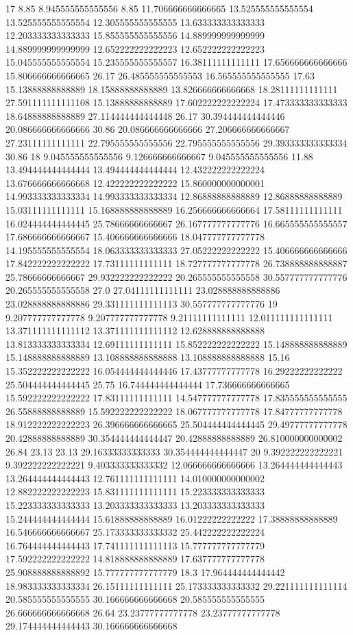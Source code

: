 17 8.85 8.945555555555556 8.85 11.706666666666665 13.525555555555554 13.525555555555554 12.305555555555555 13.633333333333333 12.203333333333333 15.855555555555556 14.889999999999999 14.889999999999999 12.652222222222223 12.652222222222223 15.045555555555554 15.235555555555557 16.38111111111111 17.656666666666666 15.806666666666665 26.17 26.485555555555553 16.565555555555555 17.63 15.13888888888889 18.15888888888889 13.826666666666668 18.28111111111111 27.591111111111108 15.13888888888889 17.602222222222224 17.473333333333333 18.64888888888889 27.114444444444448 26.17 30.394444444444446 20.086666666666666 30.86 20.086666666666666 27.206666666666667 27.23111111111111 22.795555555555556 22.795555555555556 29.393333333333334 30.86
18 9.045555555555556 9.126666666666667 9.045555555555556 11.88 13.494444444444444 13.494444444444444 12.432222222222224 13.676666666666668 12.422222222222222 15.860000000000001 14.993333333333334 14.993333333333334 12.86888888888889 12.86888888888889 15.03111111111111 15.168888888888889 16.256666666666664 17.58111111111111 16.024444444444445 25.78666666666667 26.167777777777776 16.665555555555557 17.686666666666667 15.406666666666666 18.047777777777778 14.195555555555554 18.063333333333333 27.05222222222222 15.406666666666666 17.842222222222222 17.73111111111111 18.727777777777778 26.738888888888887 25.78666666666667 29.932222222222222 20.265555555555558 30.557777777777776 20.265555555555558 27.0 27.04111111111111 23.028888888888886 23.028888888888886 29.331111111111113 30.557777777777776
19 9.207777777777778 9.207777777777778 9.21111111111111 12.011111111111111 13.371111111111112 13.371111111111112 12.628888888888888 13.813333333333334 12.69111111111111 15.852222222222222 15.148888888888889 15.148888888888889 13.108888888888888 13.108888888888888 15.16 15.352222222222222 16.054444444444446 17.43777777777778 16.29222222222222 25.504444444444445 25.75 16.744444444444444 17.736666666666665 15.592222222222222 17.83111111111111 14.547777777777778 17.835555555555555 26.55888888888889 15.592222222222222 18.067777777777778 17.84777777777778 18.912222222222223 26.396666666666665 25.504444444444445 29.49777777777778 20.42888888888889 30.354444444444447 20.42888888888889 26.810000000000002 26.84 23.13 23.13 29.16333333333333 30.354444444444447
20 9.392222222222221 9.392222222222221 9.403333333333332 12.066666666666666 13.264444444444443 13.264444444444443 12.761111111111111 14.010000000000002 12.882222222222223 15.831111111111111 15.223333333333333 15.223333333333333 13.203333333333333 13.203333333333333 15.244444444444444 15.61888888888889 16.01222222222222 17.38888888888889 16.546666666666667 25.173333333333332 25.442222222222224 16.764444444444443 17.741111111111113 15.777777777777779 17.592222222222222 14.818888888888889 17.637777777777778 25.908888888888892 15.777777777777779 18.3 17.964444444444442 18.983333333333334 26.15111111111111 25.173333333333332 29.221111111111114 20.585555555555555 30.166666666666668 20.585555555555555 26.666666666666668 26.64 23.23777777777778 23.23777777777778 29.174444444444443 30.166666666666668

